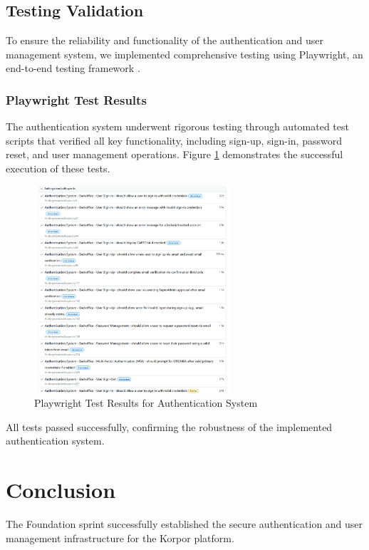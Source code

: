 \newpage

\subsection{Testing Validation}
To ensure the reliability and functionality of the authentication and user management system, we implemented comprehensive testing using Playwright, an end-to-end testing framework \cite{PlaywrightDocs2023}.

\subsubsection{Playwright Test Results}
The authentication system underwent rigorous testing through automated test scripts that verified all key functionality, including sign-up, sign-in, password reset, and user management operations. Figure \ref{fig:playwright-tests} demonstrates the successful execution of these tests.
\begin{figure}[htbp]
    \centering
    \includegraphics[width=0.65\textwidth]{images/playwright-test-results.png}
    \caption{Playwright Test Results for Authentication System}
    \label{fig:playwright-tests}
\end{figure}


All tests passed successfully, confirming the robustness of the implemented authentication system.

\section*{Conclusion}

The Foundation sprint successfully established the secure authentication and user management infrastructure for the Korpor platform.

